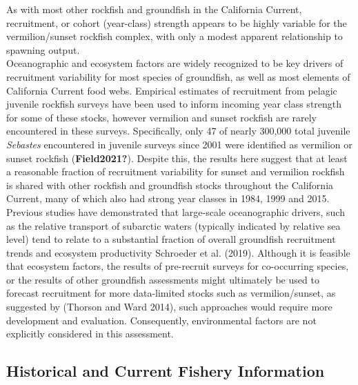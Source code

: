 \documentclass[11pt,
  english,
  a4paper,
]{article}
\begin{document}
As with most other rockfish and groundfish in the California Current, recruitment, or cohort (year-class) strength appears to be highly variable for the vermilion/sunset rockfish complex, with only a modest apparent relationship to spawning output.\\
Oceanographic and ecosystem factors are widely recognized to be key drivers of recruitment variability for most species of groundfish, as well as most elements of California Current food webs. Empirical estimates of recruitment from pelagic juvenile rockfish surveys have been used to inform incoming year class strength for some of these stocks, however vermilion and sunset rockfish are rarely encountered in these surveys. Specifically, only 47 of nearly 300,000 total juvenile \emph{Sebastes} encountered in juvenile surveys since 2001 were identified as vermilion or sunset rockfish {(\textbf{Field2021?})\leavevmode\tagmcend\tagstructend}. Despite this, the results here suggest that at least a reasonable fraction of recruitment variability for sunset and vermilion rockfish is shared with other rockfish and groundfish stocks throughout the California Current, many of which also had strong year classes in 1984, 1999 and 2015. Previous studies have demonstrated that large-scale oceanographic drivers, such as the relative transport of subarctic waters (typically indicated by relative sea level) tend to relate to a substantial fraction of overall groundfish recruitment trends and ecosystem productivity {Schroeder et al. (2019)\leavevmode\tagmcend\tagstructend}. Although it is feasible that ecosystem factors, the results of pre-recruit surveys for co-occurring species, or the results of other groundfish assessments might ultimately be used to forecast recruitment for more data-limited stocks such as vermilion/sunset, as suggested by {(Thorson and Ward 2014)\leavevmode\tagmcend\tagstructend}, such approaches would require more development and evaluation. Consequently, environmental factors are not explicitly considered in this assessment.


\hypertarget{historical-and-current-fishery-information}{%
\subsection{Historical and Current Fishery Information}\label{historical-and-current-fishery-information}}
\end{document}
